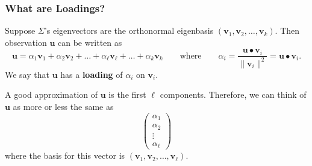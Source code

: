 \documentclass{beamer}
\begin{document}
\begin{frame}
\frametitle{What are Loadings?}
\small
Suppose $\Sigma$'s eigenvectors are the orthonormal eigenbasis $({\boldsymbol v_1}, {\boldsymbol v_2},\ldots, {\boldsymbol v_k})$. Then observation ${\boldsymbol u}$ can be written as
$$
{\boldsymbol u} = \alpha_1 {\boldsymbol v_1} + \alpha_2 {\boldsymbol v_2} +\ldots + \alpha_\ell {\boldsymbol v_\ell}+ \ldots +\alpha_k {\boldsymbol v_k}\qquad\text{where}\qquad \alpha_i = \frac{{\boldsymbol u} \bullet {\boldsymbol v_i}}{\|{\boldsymbol v_i}\|^2} = {\boldsymbol u} \bullet {\boldsymbol v_i}.
$$
We say that ${\boldsymbol u}$ has a {\bf loading} of $\alpha_i$ on ${\boldsymbol v_i}$.

A good approximation of $\boldsymbol u$ is the first $\ell$ components. Therefore, we can think of $\boldsymbol u$ as more or less the same as
$$
\left(\begin{array}{c} \alpha_1\\ \alpha_2\\ \vdots\\ \alpha_\ell \end{array}\right)
$$
where the basis for this vector is $({\boldsymbol v_1}, {\boldsymbol v_2}, \ldots, {\boldsymbol v_\ell})$.

\end{frame}
\end{document}
